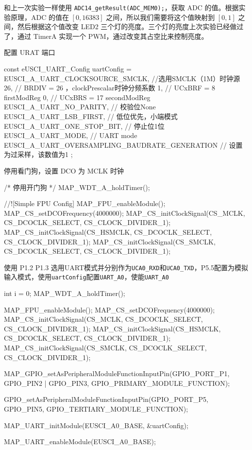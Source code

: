 \documentclass[a4paper,10pt,UTF8]{paper}
\numberwithin{equation}{section}
\numberwithin{figure}{section}
\begin{document}
和上一次实验一样使用 \texttt{ADC14\_getResult(ADC\_MEM0);}，获取 ADC 的值。根据实验原理，ADC 的值在 $[0,16383]$ 之间，所以我们需要将这个值映射到 $[0,1]$ 之间，然后根据这个值改变 LED2 三个灯的亮度。三个灯的亮度上次实验已经做过了，通过 TimerA 实现一个 PWM，通过改变其占空比来控制亮度。


配置 URAT 端口

\begin{ccode}
    const eUSCI_UART_Config uartConfig =
    {
        EUSCI_A_UART_CLOCKSOURCE_SMCLK,               
        //选用SMCLK（1M）时钟源
        26,                                           
        // BRDIV = 26 ，clockPrescalar时钟分频系数
        1,                                            
        // UCxBRF = 8  firstModReg 
        0,                                            
        // UCxBRS = 17 secondModReg
        EUSCI_A_UART_NO_PARITY,                       
        // 校验位None
        EUSCI_A_UART_LSB_FIRST,                       
        // 低位优先，小端模式
        EUSCI_A_UART_ONE_STOP_BIT,                    
        // 停止位1位
        EUSCI_A_UART_MODE,                           
         // UART mode
        EUSCI_A_UART_OVERSAMPLING_BAUDRATE_GENERATION 
        // 设置为过采样，该数值为1
    };
\end{ccode}

停用看门狗，设置 DCO 为 MCLK 时钟

\begin{ccode}
    /* 停用开门狗 */
    MAP_WDT_A_holdTimer();

    //![Simple FPU Config]
    MAP_FPU_enableModule();  
    MAP_CS_setDCOFrequency(4000000); 
    MAP_CS_initClockSignal(CS_MCLK, CS_DCOCLK_SELECT, CS_CLOCK_DIVIDER_1); 
    MAP_CS_initClockSignal(CS_HSMCLK, CS_DCOCLK_SELECT, CS_CLOCK_DIVIDER_1);
    MAP_CS_initClockSignal(CS_SMCLK, CS_DCOCLK_SELECT, CS_CLOCK_DIVIDER_1);
\end{ccode}

使用 P1.2 P1.3 选用UART模式并分别作为\texttt{UCA0\_RXD}和\texttt{UCA0\_TXD}，P5.5配置为模拟输入模式，使用\texttt{uartConfig}配置\texttt{UART\_A0}，使能\texttt{UART\_A0}

\begin{ccode}
    int i = 0;
    MAP_WDT_A_holdTimer();

    MAP_FPU_enableModule();   
    MAP_CS_setDCOFrequency(4000000);    
    MAP_CS_initClockSignal(CS_MCLK, CS_DCOCLK_SELECT, CS_CLOCK_DIVIDER_1);  
    MAP_CS_initClockSignal(CS_HSMCLK, CS_DCOCLK_SELECT, CS_CLOCK_DIVIDER_1); 
    MAP_CS_initClockSignal(CS_SMCLK, CS_DCOCLK_SELECT, CS_CLOCK_DIVIDER_1);  

	MAP_GPIO_setAsPeripheralModuleFunctionInputPin(GPIO_PORT_P1,
	 GPIO_PIN2 | GPIO_PIN3, GPIO_PRIMARY_MODULE_FUNCTION);

    GPIO_setAsPeripheralModuleFunctionInputPin(GPIO_PORT_P5,
     GPIO_PIN5, GPIO_TERTIARY_MODULE_FUNCTION);

    MAP_UART_initModule(EUSCI_A0_BASE, &uartConfig);

    MAP_UART_enableModule(EUSCI_A0_BASE);
\end{ccode}
\end{document}
